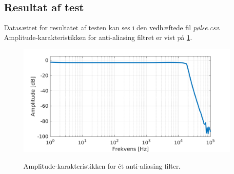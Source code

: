 \subsection{Resultat af test}
Datasættet for resultatet af testen kan ses i den vedhæftede fil \textit{pølse.csv}. Amplitude-karakteristikken for anti-aliasing filtret er vist på \ref{fig:tf_filter}. 


\begin{figure}[h]
	\caption{Amplitude-karakteristikken for ét anti-aliasing filter.}
	\includegraphics[width=1\linewidth]{matlab/tf_AAfilter.png}
	\label{fig:tf_filter}
\end{figure}